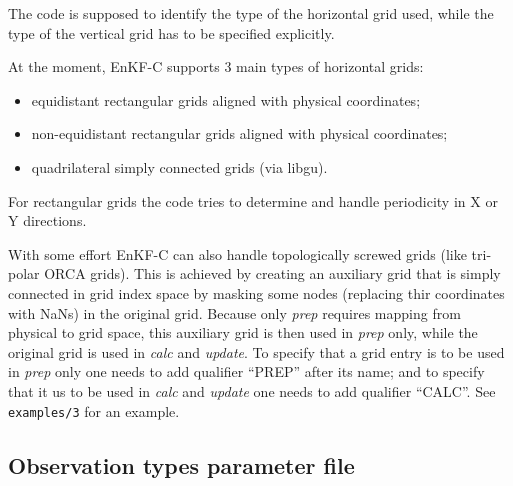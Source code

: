 \documentclass[11pt]{report}
\begin{document}
The code is supposed to identify the type of the horizontal grid used, while the type of the vertical grid has to be specified explicitly.

At the moment, EnKF-C supports 3 main types of horizontal grids:
\begin{itemize}
\item equidistant rectangular grids aligned with physical coordinates;
\item non-equidistant rectangular grids aligned with physical coordinates;
\item quadrilateral simply connected grids (via libgu).
\end{itemize}
For rectangular grids the code tries to determine and handle periodicity in X or Y directions.

With some effort EnKF-C can also handle topologically screwed grids (like tri-polar ORCA grids).
This is achieved by creating an auxiliary grid that is simply connected in grid index space by masking some nodes (replacing thir coordinates with NaNs) in the original grid.
Because only \emph{prep} requires mapping from physical to grid space, this auxiliary grid is then used in \emph{prep} only, while the original grid is used in \emph{calc} and \emph{update}.
To specify that a grid entry is to be used in \emph{prep} only one needs to add qualifier ``PREP'' after its name; and to specify that it us to be used in \emph{calc} and \emph{update} one needs to add qualifier ``CALC''.
See \verb|examples/3| for an example.

\subsection{Observation types parameter file}
\label{sec:obstypesprm}
\end{document}
